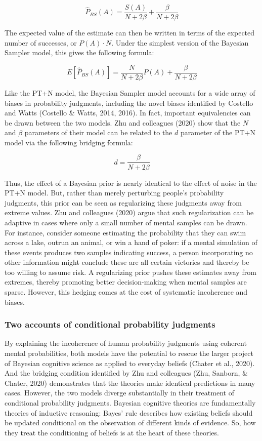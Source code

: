 \documentclass[
  english,
  man,floatsintext]{apa6}
\begin{document}
\[\hat{P}_{BS}(A) = \frac{S(A)}{N+2\beta} + \frac{\beta}{N+2\beta}\]

The expected value of the estimate can then be written in terms of the expected number of successes, or \(P(A) \cdot N\). Under the simplest version of the Bayesian Sampler model, this gives the following formula:

\[E[\hat{P}_{BS}(A)] = \frac{N}{N+2\beta}P(A) + \frac{\beta}{N+2\beta}\]

Like the PT+N model, the Bayesian Sampler model accounts for a wide array of biases in probability judgments, including the novel biases identified by Costello and Watts (Costello \& Watts, 2014, 2016). In fact, important equivalencies can be drawn between the two models. Zhu and colleagues (2020) show that the \(N\) and \(\beta\) parameters of their model can be related to the \(d\) parameter of the PT+N model via the following bridging formula:

\[d = \frac{\beta}{N+2\beta}\]

Thus, the effect of a Bayesian prior is nearly identical to the effect of noise in the PT+N model. But, rather than merely perturbing people's probability judgments, this prior can be seen as regularizing these judgments away from extreme values. Zhu and colleagues (2020) argue that such regularization can be adaptive in cases where only a small number of mental samples can be drawn. For instance, consider someone estimating the probability that they can swim across a lake, outrun an animal, or win a hand of poker: if a mental simulation of these events produces two samples indicating success, a person incorporating no other information might conclude these are all certain victories and thereby be too willing to assume risk. A regularizing prior pushes these estimates away from extremes, thereby promoting better decision-making when mental samples are sparse. However, this hedging comes at the cost of systematic incoherence and biases.

\hypertarget{two-accounts-of-conditional-probability-judgments}{%
\subsubsection{Two accounts of conditional probability judgments}\label{two-accounts-of-conditional-probability-judgments}}

By explaining the incoherence of human probability judgments using coherent mental probabilities, both models have the potential to rescue the larger project of Bayesian cognitive science as applied to everyday beliefs (Chater et al., 2020). And the bridging condition identified by Zhu and colleagues (Zhu, Sanborn, \& Chater, 2020) demonstrates that the theories make identical predictions in many cases. However, the two models diverge substantially in their treatment of conditional probability judgments. Bayesian cognitive theories are fundamentally theories of inductive reasoning: Bayes' rule describes how existing beliefs should be updated conditional on the observation of different kinds of evidence. So, how they treat the conditioning of beliefs is at the heart of these theories.
\end{document}
